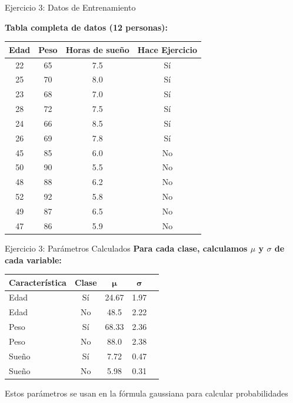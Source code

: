 \documentclass{beamer}
\begin{document}
\begin{frame}{Ejercicio 3: Datos de Entrenamiento}
    \begin{center}
        \textbf{Tabla completa de datos (12 personas):}

        \begin{tabular}{cccc}
            \toprule
            Edad & Peso & Horas de sueño & Hace Ejercicio \\
            \midrule
            22 & 65 & 7.5 & Sí \\
            25 & 70 & 8.0 & Sí \\
            23 & 68 & 7.0 & Sí \\
            28 & 72 & 7.5 & Sí \\
            24 & 66 & 8.5 & Sí \\
            26 & 69 & 7.8 & Sí \\
            45 & 85 & 6.0 & No \\
            50 & 90 & 5.5 & No \\
            48 & 88 & 6.2 & No \\
            52 & 92 & 5.8 & No \\
            49 & 87 & 6.5 & No \\
            47 & 86 & 5.9 & No \\
            \bottomrule
        \end{tabular}
    \end{center}
\end{frame}

\begin{frame}{Ejercicio 3: Parámetros Calculados}
    \textbf{Para cada clase, calculamos $\mu$ y $\sigma$ de cada variable:}

    \vspace{0.5cm}

    \begin{center}
        \small
        \begin{tabular}{lcccc}
            \toprule
            \textbf{Característica} & \textbf{Clase} & $\boldsymbol{\mu}$ & $\boldsymbol{\sigma}$ \\
            \midrule
            Edad   & Sí & 24.67 & 1.97 \\
            Edad   & No & 48.5  & 2.22 \\
            \midrule
            Peso   & Sí & 68.33 & 2.36 \\
            Peso   & No & 88.0  & 2.38 \\
            \midrule
            Sueño  & Sí & 7.72  & 0.47 \\
            Sueño  & No & 5.98  & 0.31 \\
            \bottomrule
        \end{tabular}
    \end{center}

    \vspace{0.5cm}

    Estos parámetros se usan en la fórmula gaussiana para calcular probabilidades
\end{frame}
\end{document}
